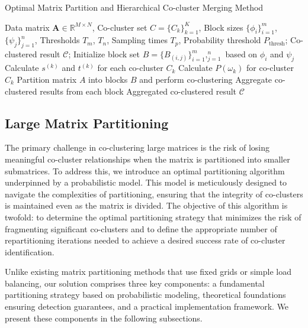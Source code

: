 \documentclass[journal]{IEEEtran}
\theoremstyle{definition}
\theoremstyle{remark} %
\begin{document}
\begin{algorithm}[!t]
    \caption{Optimal Matrix Partition and Hierarchical Co-cluster Merging Method}
    \begin{algorithmic}[1]
        \REQUIRE Data matrix $\mathbf{A} \in \mathbb{R}^{M \times N}$, Co-cluster set $C = \{C_k\}_{k=1}^K$, Block sizes $\{\phi_i\}_{i=1}^m$, $\{\psi_j\}_{j=1}^n$, Thresholds $T_m$, $T_n$, Sampling times $T_p$, Probability threshold $P_\text{thresh}$;
        \ENSURE Co-clustered result $\mathcal{C}$;
        \STATE Initialize block set $B = \{B_{(i,j)}\}_{i=1}^m,_{j=1}^n$ based on $\phi_i$ and $\psi_j$
        \STATE Calculate $s^{(k)}$ and $t^{(k)}$ for each co-cluster $C_k$
        \STATE Calculate $P(\omega_k)$ for co-cluster $C_k$
        \STATE Partition matrix $A$ into blocks $B$ and perform co-clustering
        \STATE Aggregate co-clustered results from each block
        \ENDIF
        \ENDFOR
        \RETURN Aggregated co-clustered result $\mathcal{C}$
    \end{algorithmic}
    \label{alg:method}
\end{algorithm}


\subsection{Large Matrix Partitioning}
\label{subsec:large-matrix-partitioning}
The primary challenge in co-clustering large matrices is the risk of losing meaningful co-cluster relationships when the matrix is partitioned into smaller submatrices. To address this, we introduce an optimal partitioning algorithm underpinned by a probabilistic model. This model is meticulously designed to navigate the complexities of partitioning, ensuring that the integrity of co-clusters is maintained even as the matrix is divided. The objective of this algorithm is twofold: to determine the optimal partitioning strategy that minimizes the risk of fragmenting significant co-clusters and to define the appropriate number of repartitioning iterations needed to achieve a desired success rate of co-cluster identification.

    {\color{blue}Unlike existing matrix partitioning methods that use fixed grids or simple load balancing,  our solution comprises three key components: a fundamental partitioning strategy based on probabilistic modeling, theoretical foundations ensuring detection guarantees, and a practical implementation framework. We present these components in the following subsections.
    }
\end{document}
